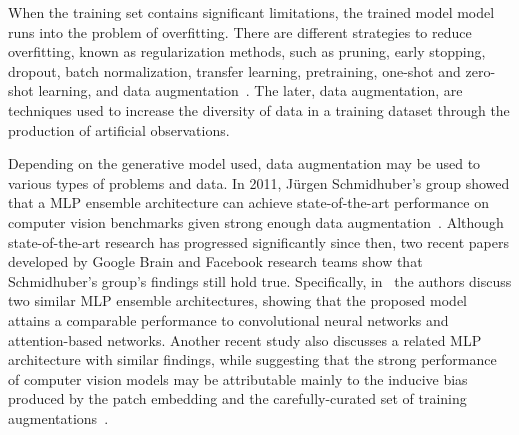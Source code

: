 \documentclass[parskip=full]{scrartcl}
\begin{document}

When the training set contains significant limitations, the trained model
model runs into the problem of overfitting. There are different strategies to
reduce overfitting, known as regularization methods, such as pruning, early
stopping, dropout, batch normalization, transfer learning, pretraining,
one-shot and zero-shot learning, and data augmentation~\cite{Shorten2019}. The
later, data augmentation, are techniques used to increase the diversity of data
in a training dataset through the production of artificial observations.

% 


Depending on the generative model used, data augmentation may be used to
various types of problems and data. In 2011, Jürgen Schmidhuber's group showed
that a MLP ensemble architecture can achieve state-of-the-art performance on
computer vision benchmarks given strong enough data
augmentation~\cite{Meier2011, Ciresan2011}. Although state-of-the-art research
has progressed significantly since then, two recent papers developed by Google
Brain and Facebook research teams show that Schmidhuber's group's findings
still hold true. Specifically, in~\cite{Tolstikhin2021, Touvron2021} the
authors discuss two similar MLP ensemble architectures, showing that the
proposed model attains a comparable performance to convolutional neural
networks and attention-based networks. Another recent study also discusses a
related MLP architecture with similar findings, while suggesting that the
strong performance of computer vision models may be attributable mainly to the
inducive bias produced by the patch embedding and the carefully-curated
set of training augmentations~\cite{Melaskyriazi2021}.
\end{document}
